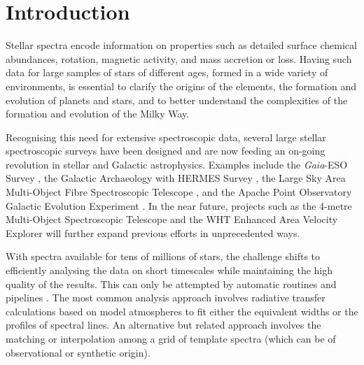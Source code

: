 \documentclass{aa}
\begin{document}

   \maketitle
%
\nolinenumbers
\section{Introduction}
\label{sec:introduction}

Stellar spectra encode information on properties such as detailed surface chemical abundances, rotation, magnetic activity, and mass accretion or loss. Having such data for large samples of stars of different ages, formed in a wide variety of environments, is essential to clarify the origins of the elements, the formation and evolution of planets and stars, and to better understand the complexities of the formation and evolution of the Milky Way. 

Recognising this need for extensive spectroscopic data, several large stellar spectroscopic surveys have been designed and are now feeding an on-going revolution in stellar and Galactic astrophysics. Examples include the \textit{Gaia}-ESO Survey \cite[GES,][]{2022A&A...666A.120G, 2022A&A...666A.121R}, the Galactic Archaeology with HERMES Survey \citep[GALAH,][]{DeSilva2015}, the Large Sky Area Multi-Object Fibre Spectroscopic Telescope \cite[LAMOST,][]{lamost, lamost-mrs}, and the Apache Point Observatory Galactic Evolution Experiment \cite[APOGEE,][]{2017AJ....154...94M}. In the near future, projects such as the 4-metre Multi-Object Spectroscopic Telescope \cite[4MOST,][]{2019Msngr.175....3D} and the WHT Enhanced Area Velocity Explorer \cite[WEAVE,][]{2024MNRAS.530.2688J} will further expand previous efforts in unprecedented ways.

With spectra available for tens of millions of stars, the challenge shifts to efficiently analysing the data on short timescales while maintaining the high quality of the results. This can only be attempted by automatic routines and pipelines \citep[e.g.][to mention only a few]{RecioBlanco2006, Magrini2013, ASPCAP, Hanke2018, Tabernero2022, Li2024}. The most common analysis approach involves radiative transfer calculations based on model atmospheres to fit either the equivalent widths or the profiles of spectral lines. An alternative but related approach involves the matching or interpolation among a grid of template spectra (which can be of observational or synthetic origin).
\end{document}
